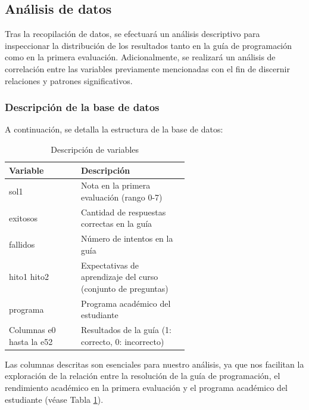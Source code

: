 \subsection{Análisis de datos}

Tras la recopilación de datos, se efectuará un análisis descriptivo para inspeccionar la distribución de los resultados tanto en la guía de programación como en la primera evaluación. Adicionalmente, se realizará un análisis de correlación entre las variables previamente mencionadas con el fin de discernir relaciones y patrones significativos.

\subsubsection{Descripción de la base de datos}

A continuación, se detalla la estructura de la base de datos:

\begin{table}[H]
    \centering
    \caption{Descripción de variables}
    \begin{tabular}{lp{0.6\linewidth}}
        \toprule
        \textbf{Variable}        & \textbf{Descripción}                                          \\
        \midrule
        sol1                     & Nota en la primera evaluación (rango 0-7)                     \\
        exitosos                 & Cantidad de respuestas correctas en la guía                   \\
        fallidos                 & Número de intentos en la guía                                 \\
        hito1 hito2              & Expectativas de aprendizaje del curso (conjunto de preguntas) \\
        programa                 & Programa académico del estudiante                             \\
        Columnas e0 hasta la e52 & Resultados de la guía (1: correcto, 0: incorrecto)            \\
        \bottomrule
    \end{tabular}
    \label{tab:variables}
\end{table}

Las columnas descritas son esenciales para nuestro análisis, ya que nos facilitan la exploración de la relación entre la resolución de la guía de programación, el rendimiento académico en la primera evaluación y el programa académico del estudiante (véase Tabla \ref{tab:variables}).

